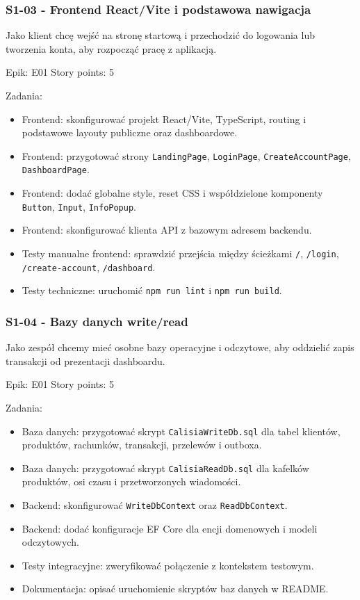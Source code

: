\documentclass[12pt,a4paper]{article}
\begin{document}
\subsubsection*{S1-03 - Frontend React/Vite i podstawowa nawigacja}

Jako klient chcę wejść na stronę startową i przechodzić do logowania lub tworzenia konta, aby rozpocząć pracę z aplikacją.

Epik: E01
Story points: 5

Zadania:

\begin{itemize}
\item Frontend: skonfigurować projekt React/Vite, TypeScript, routing i podstawowe layouty publiczne oraz dashboardowe.
\item Frontend: przygotować strony \texttt{LandingPage}, \texttt{LoginPage}, \texttt{CreateAccountPage}, \texttt{DashboardPage}.
\item Frontend: dodać globalne style, reset CSS i współdzielone komponenty \texttt{Button}, \texttt{Input}, \texttt{InfoPopup}.
\item Frontend: skonfigurować klienta API z bazowym adresem backendu.
\item Testy manualne frontend: sprawdzić przejścia między ścieżkami \texttt{/}, \texttt{/login}, \texttt{/create-account}, \texttt{/dashboard}.
\item Testy techniczne: uruchomić \texttt{npm run lint} i \texttt{npm run build}.
\end{itemize}

\subsubsection*{S1-04 - Bazy danych write/read}

Jako zespół chcemy mieć osobne bazy operacyjne i odczytowe, aby oddzielić zapis transakcji od prezentacji dashboardu.

Epik: E01
Story points: 5

Zadania:

\begin{itemize}
\item Baza danych: przygotować skrypt \texttt{CalisiaWriteDb.sql} dla tabel klientów, produktów, rachunków, transakcji, przelewów i outboxa.
\item Baza danych: przygotować skrypt \texttt{CalisiaReadDb.sql} dla kafelków produktów, osi czasu i przetworzonych wiadomości.
\item Backend: skonfigurować \texttt{WriteDbContext} oraz \texttt{ReadDbContext}.
\item Backend: dodać konfiguracje EF Core dla encji domenowych i modeli odczytowych.
\item Testy integracyjne: zweryfikować połączenie z kontekstem testowym.
\item Dokumentacja: opisać uruchomienie skryptów baz danych w README.
\end{itemize}
\end{document}

